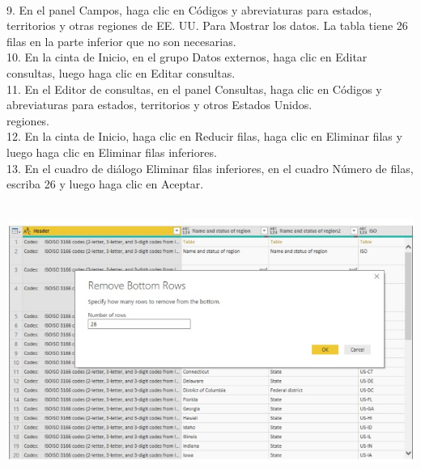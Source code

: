\documentclass[12pt,letterpaper]{article}
\begin{document}
\begin{flushleft}
\begin{itemize}
\textbf{ }\\
\textbf{ }\\
\textbf{ }\\
\textbf{ }\\
\textbf{ }\\
\textbf{ }\\
9. En el panel Campos, haga clic en Códigos y abreviaturas para estados, territorios y otras regiones de EE. UU. Para
Mostrar los datos. La tabla tiene 26 filas en la parte inferior que no son necesarias.\\
10. En la cinta de Inicio, en el grupo Datos externos, haga clic en Editar consultas, luego haga clic en Editar consultas.\\
11. En el Editor de consultas, en el panel Consultas, haga clic en Códigos y abreviaturas para estados, territorios y otros Estados Unidos.\\
regiones.\\
12. En la cinta de Inicio, haga clic en Reducir filas, haga clic en Eliminar filas y luego haga clic en Eliminar filas inferiores.\\
13. En el cuadro de diálogo Eliminar filas inferiores, en el cuadro Número de filas, escriba 26 y luego haga clic en Aceptar.\\
\textbf{ }\\
\begin{center}
	\includegraphics[width=15cm]{./Imagenes/image30} 
	\end{center}
\textbf{ }\\
\textbf{ }\\
\textbf{ }\\
\textbf{ }\\
\textbf{ }\\
\textbf{ }\\
\textbf{ }\\

\end{itemize}
\end{flushleft}
\end{document}
